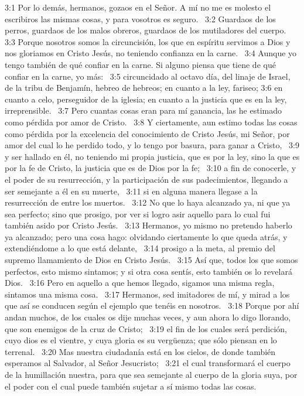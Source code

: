 3:1 Por lo demás, hermanos, gozaos en el Señor. A mí no me es molesto el escribiros las mismas cosas, y para vosotros es seguro.  
3:2 Guardaos de los perros, guardaos de los malos obreros, guardaos de los mutiladores del cuerpo.  
3:3 Porque nosotros somos la circuncisión, los que en espíritu servimos a Dios y nos gloriamos en Cristo Jesús, no teniendo confianza en la carne.  
3:4 Aunque yo tengo también de qué confiar en la carne. Si alguno piensa que tiene de qué confiar en la carne, yo más:  
3:5 circuncidado al octavo día, del linaje de Israel, de la tribu de Benjamín, hebreo de hebreos; en cuanto a la ley, fariseo; 
3:6 en cuanto a celo, perseguidor de la iglesia; en cuanto a la justicia que es en la ley, irreprensible.  
3:7 Pero cuantas cosas eran para mí ganancia, las he estimado como pérdida por amor de Cristo.  
3:8 Y ciertamente, aun estimo todas las cosas como pérdida por la excelencia del conocimiento de Cristo Jesús, mi Señor, por amor del cual lo he perdido todo, y lo tengo por basura, para ganar a Cristo,  
3:9 y ser hallado en él, no teniendo mi propia justicia, que es por la ley, sino la que es por la fe de Cristo, la justicia que es de Dios por la fe;  
3:10 a fin de conocerle, y el poder de su resurrección, y la participación de sus padecimientos, llegando a ser semejante a él en su muerte,  
3:11 si en alguna manera llegase a la resurrección de entre los muertos.  
3:12 No que lo haya alcanzado ya, ni que ya sea perfecto; sino que prosigo, por ver si logro asir aquello para lo cual fui también asido por Cristo Jesús.  
3:13 Hermanos, yo mismo no pretendo haberlo ya alcanzado; pero una cosa hago: olvidando ciertamente lo que queda atrás, y extendiéndome a lo que está delante,  
3:14 prosigo a la meta, al premio del supremo llamamiento de Dios en Cristo Jesús.  
3:15 Así que, todos los que somos perfectos, esto mismo sintamos; y si otra cosa sentís, esto también os lo revelará Dios.  
3:16 Pero en aquello a que hemos llegado, sigamos una misma regla, sintamos una misma cosa.  
3:17 Hermanos, sed imitadores de mí, y mirad a los que así se conducen según el ejemplo que tenéis en nosotros.  
3:18 Porque por ahí andan muchos, de los cuales os dije muchas veces, y aun ahora lo digo llorando, que son enemigos de la cruz de Cristo;  
3:19 el fin de los cuales será perdición, cuyo dios es el vientre, y cuya gloria es su vergüenza; que sólo piensan en lo terrenal.  
3:20 Mas nuestra ciudadanía está en los cielos, de donde también esperamos al Salvador, al Señor Jesucristo;  
3:21 el cual transformará el cuerpo de la humillación nuestra, para que sea semejante al cuerpo de la gloria suya, por el poder con el cual puede también sujetar a sí mismo todas las cosas.  
